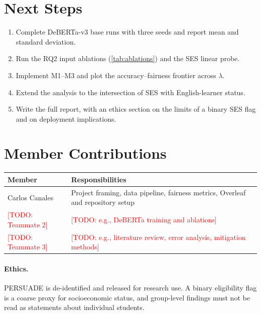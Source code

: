 \documentclass{article}
\newcommand{\TODO}[1]{\textcolor{red}{[TODO: #1]}}
\begin{document}
\section{Next Steps}
\label{sec:next}

\begin{enumerate}
  \item Complete DeBERTa-v3 base runs with three seeds and report mean and standard deviation.
  \item Run the RQ2 input ablations (\cref{tab:ablations}) and the SES linear probe.
  \item Implement M1--M3 and plot the accuracy--fairness frontier across $\lambda$.
  \item Extend the analysis to the intersection of SES with English-learner status.
  \item Write the full report, with an ethics section on the limits of a binary SES flag and on deployment implications.
\end{enumerate}

\section{Member Contributions}
\label{sec:contrib}

\begin{table}[h]
  \centering
  \small
  \begin{tabularx}{\linewidth}{l X}
    \toprule
    Member & Responsibilities \\
    \midrule
    Carlos Canales & Project framing, data pipeline, fairness metrics, Overleaf and repository setup \\
    \TODO{Teammate 2} & \TODO{e.g., DeBERTa training and ablations} \\
    \TODO{Teammate 3} & \TODO{e.g., literature review, error analysis, mitigation methods} \\
    \bottomrule
  \end{tabularx}
\end{table}

\paragraph{Ethics.} PERSUADE is de-identified and released for research use. A binary eligibility flag is a coarse proxy for socioeconomic status, and group-level findings must not be read as statements about individual students.



\end{document}
